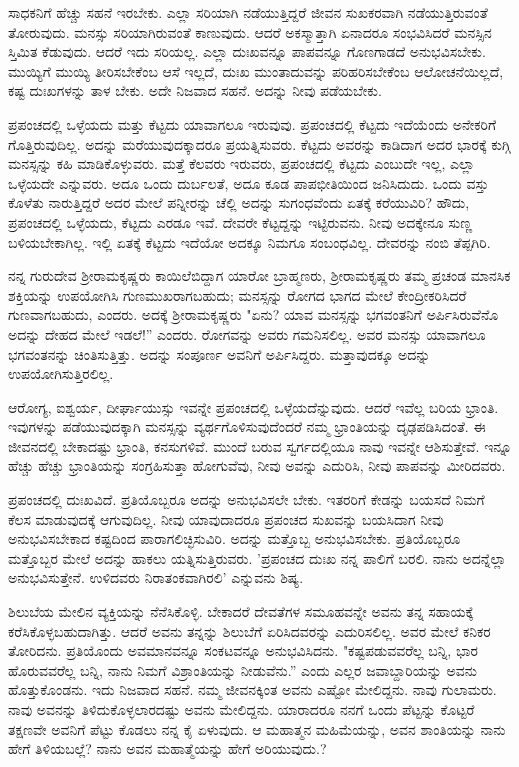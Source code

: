 ಸಾಧಕನಿಗೆ ಹೆಚ್ಚು ಸಹನೆ ಇರಬೇಕು. ಎಲ್ಲಾ ಸರಿಯಾಗಿ ನಡೆಯುತ್ತಿದ್ದರೆ ಜೀವನ ಸುಖಕರವಾಗಿ ನಡೆಯುತ್ತಿರುವಂತೆ ತೋರುವುದು. ಮನಸ್ಸು ಸರಿಯಾಗಿರುವಂತೆ ಕಾಣುವುದು. ಆದರೆ ಅಕಸ್ಮಾತ್ತಾಗಿ ಏನಾದರೂ ಸಂಭವಿಸಿದರೆ ಮನಸ್ಸಿನ ಸ್ತಿಮಿತ ಕೆಡುವುದು. ಆದರೆ ಇದು ಸರಿಯಲ್ಲ. ಎಲ್ಲಾ ದುಃಖವನ್ನೂ ಪಾಪವನ್ನೂ ಗೊಣಗಾಡದೆ ಅನುಭವಿಸಬೇಕು. ಮುಯ್ಯಿಗೆ ಮುಯ್ಯಿ ತೀರಿಸಬೇಕೆಂಬ ಆಸೆ ಇಲ್ಲದೆ, ದುಃಖ ಮುಂತಾದುವನ್ನು ಪರಿಹರಿಸಬೇಕೆಂಬ ಆಲೋಚನೆಯಿಲ್ಲದೆ, ಕಷ್ಟ ದುಃಖಗಳನ್ನು ತಾಳ ಬೇಕು. ಅದೇ ನಿಜವಾದ ಸಹನೆ. ಅದನ್ನು ನೀವು ಪಡೆಯಬೇಕು.

ಪ್ರಪಂಚದಲ್ಲಿ ಒಳ್ಳೆಯದು ಮತ್ತು ಕೆಟ್ಟದು ಯಾವಾಗಲೂ ಇರುವುವು. ಪ್ರಪಂಚದಲ್ಲಿ ಕೆಟ್ಟದು ಇದೆಯೆಂದು ಅನೇಕರಿಗೆ ಗೊತ್ತಿರುವುದಿಲ್ಲ. ಅದನ್ನು ಮರೆಯುವುದಕ್ಕಾದರೂ ಪ್ರಯತ್ನಿಸುವರು. ಕೆಟ್ಟದು ಅವರನ್ನು ಕಾಡಿದಾಗ ಅದರ ಭಾರಕ್ಕೆ ಕುಗ್ಗಿ ಮನಸ್ಸನ್ನು ಕಹಿ ಮಾಡಿಕೊಳ್ಳುವರು. ಮತ್ತೆ ಕೆಲವರು ಇರುವರು, ಪ್ರಪಂಚದಲ್ಲಿ ಕೆಟ್ಟದು ಎಂಬುದೇ ಇಲ್ಲ, ಎಲ್ಲಾ ಒಳ್ಳೆಯದೇ ಎನ್ನುವರು. ಅದೂ ಒಂದು ದುರ್ಬಲತೆ, ಅದೂ ಕೂಡ ಪಾಪಭೀತಿಯಿಂದ ಜನಿಸಿದುದು. ಒಂದು ವಸ್ತು ಕೊಳೆತು ನಾರುತ್ತಿದ್ದರೆ ಅದರ ಮೇಲೆ ಪನ್ನೀರನ್ನು ಚೆಲ್ಲಿ ಅದನ್ನು ಸುಗಂಧವೆಂದು ಏತಕ್ಕೆ ಕರೆಯುವಿರಿ? ಹೌದು, ಪ್ರಪಂಚದಲ್ಲಿ ಒಳ್ಳೆಯದು, ಕೆಟ್ಟದು ಎರಡೂ ಇವೆ. ದೇವರೇ ಕೆಟ್ಟದ್ದನ್ನು ಇಟ್ಟಿರುವನು. ನೀವು ಅದಕ್ಕೇನೂ ಸುಣ್ಣ ಬಳಿಯಬೇಕಾಗಿಲ್ಲ. ಇಲ್ಲಿ ಏತಕ್ಕೆ ಕೆಟ್ಟದು ಇದೆಯೋ ಅದಕ್ಕೂ ನಿಮಗೂ ಸಂಬಂಧವಿಲ್ಲ. ದೇವರನ್ನು ನಂಬಿ ತೆಪ್ಪಗಿರಿ.

ನನ್ನ ಗುರುದೇವ ಶ‍್ರೀರಾಮಕೃಷ್ಣರು ಕಾಯಿಲೆಬಿದ್ದಾಗ ಯಾರೋ ಬ್ರಾಹ್ಮಣರು, ಶ‍್ರೀರಾಮಕೃಷ್ಣರು ತಮ್ಮ ಪ್ರಚಂಡ ಮಾನಸಿಕ ಶಕ್ತಿಯನ್ನು ಉಪಯೋಗಿಸಿ ಗುಣಮುಖರಾಗಬಹುದು; ಮನಸ್ಸನ್ನು ರೋಗದ ಭಾಗದ ಮೇಲೆ ಕೇಂದ್ರೀಕರಿಸಿದರೆ ಗುಣವಾಗಬಹುದು, ಎಂದರು. ಅದಕ್ಕೆ ಶ‍್ರೀರಾಮಕೃಷ್ಣರು "ಏನು? ಯಾವ ಮನಸ್ಸನ್ನು ಭಗವಂತನಿಗೆ ಅರ್ಪಿಸಿರುವೆನೊ ಅದನ್ನು ದೇಹದ ಮೇಲೆ ಇಡಲೆ!'' ಎಂದರು. ರೋಗವನ್ನು ಅವರು ಗಮನಿಸಲಿಲ್ಲ. ಅವರ ಮನಸ್ಸು ಯಾವಾಗಲೂ ಭಗವಂತನನ್ನು ಚಿಂತಿಸುತ್ತಿತ್ತು. ಅದನ್ನು ಸಂಪೂರ್ಣ ಅವನಿಗೆ ಅರ್ಪಿಸಿದ್ದರು. ಮತ್ತಾವುದಕ್ಕೂ ಅದನ್ನು ಉಪಯೋಗಿಸುತ್ತಿರಲಿಲ್ಲ.

ಆರೋಗ್ಯ, ಐಶ್ವರ್ಯ, ದೀರ್ಘಾಯುಸ್ಸು ಇವನ್ನೇ ಪ್ರಪಂಚದಲ್ಲಿ ಒಳ್ಳೆಯದೆನ್ನುವುದು. ಆದರೆ ಇವೆಲ್ಲ ಬರಿಯ ಭ್ರಾಂತಿ. ಇವುಗಳನ್ನು ಪಡೆಯುವುದಕ್ಕಾಗಿ ಮನಸ್ಸನ್ನು ವ್ಯರ್ಥಗೊಳಿಸುವುದೆಂದರೆ ನಮ್ಮ ಭ್ರಾಂತಿಯನ್ನು ದೃಢಪಡಿಸಿದಂತೆ. ಈ ಜೀವನದಲ್ಲಿ ಬೇಕಾದಷ್ಟು ಭ್ರಾಂತಿ, ಕನಸುಗಳಿವೆ. ಮುಂದೆ ಬರುವ ಸ್ವರ್ಗದಲ್ಲಿಯೂ ನಾವು ಇವನ್ನೇ ಆಶಿಸುತ್ತೇವೆ. ಇನ್ನೂ ಹೆಚ್ಚು ಹೆಚ್ಚು ಭ್ರಾಂತಿಯನ್ನು ಸಂಗ್ರಹಿಸುತ್ತಾ ಹೋಗುವೆವು, ನೀವು ಅವನ್ನು ಎದುರಿಸಿ, ನೀವು ಪಾಪವನ್ನು ಮೀರಿದವರು.

ಪ್ರಪಂಚದಲ್ಲಿ ದುಃಖವಿದೆ. ಪ್ರತಿಯೊಬ್ಬರೂ ಅದನ್ನು ಅನುಭವಿಸಲೇ ಬೇಕು. ಇತರರಿಗೆ ಕೇಡನ್ನು ಬಯಸದೆ ನಿಮಗೆ ಕೆಲಸ ಮಾಡುವುದಕ್ಕೆ ಆಗುವುದಿಲ್ಲ. ನೀವು ಯಾವುದಾದರೂ ಪ್ರಪಂಚದ ಸುಖವನ್ನು ಬಯಸಿದಾಗ ನೀವು ಅನುಭವಿಸಬೇಕಾದ ಕಷ್ಟದಿಂದ ಪಾರಾಗಲಿಚ್ಛಿಸುವಿರಿ. ಅದನ್ನು ಮತ್ತೊಬ್ಬ ಅನುಭವಿಸಬೇಕು. ಪ್ರತಿಯೊಬ್ಬರೂ ಮತ್ತೊಬ್ಬರ ಮೇಲೆ ಅದನ್ನು ಹಾಕಲು ಯತ್ನಿಸುತ್ತಿರುವರು. 'ಪ್ರಪಂಚದ ದುಃಖ ನನ್ನ ಪಾಲಿಗೆ ಬರಲಿ. ನಾನು ಅದನ್ನೆಲ್ಲಾ ಅನುಭವಿಸುತ್ತೇನೆ. ಉಳಿದವರು ನಿರಾತಂಕವಾಗಿರಲಿ' ಎನ್ನುವನು ಶಿಷ್ಯ.

ಶಿಲುಬೆಯ ಮೇಲಿನ ವ್ಯಕ್ತಿಯನ್ನು ನೆನೆಸಿಕೊಳ್ಳಿ. ಬೇಕಾದರೆ ದೇವತೆಗಳ ಸಮೂಹವನ್ನೇ ಅವನು ತನ್ನ ಸಹಾಯಕ್ಕೆ ಕರೆಸಿಕೊಳ್ಳಬಹುದಾಗಿತ್ತು. ಆದರೆ ಅವನು ತನ್ನನ್ನು ಶಿಲುಬೆಗೆ ಏರಿಸಿದವರನ್ನು ಎದುರಿಸಲಿಲ್ಲ. ಅವರ ಮೇಲೆ ಕನಿಕರ ತೋರಿದನು. ಪ್ರತಿಯೊಂದು ಅವಮಾನವನ್ನೂ ಸಂಕಟವನ್ನೂ ಅನುಭವಿಸಿದನು. "ಕಷ್ಟಪಡುವವರೆಲ್ಲ ಬನ್ನಿ, ಭಾರ ಹೊರುವವರೆಲ್ಲ ಬನ್ನಿ, ನಾನು ನಿಮಗೆ ವಿಶ್ರಾಂತಿಯನ್ನು ನೀಡುವೆನು.” ಎಂದು ಎಲ್ಲರ ಜವಾಬ್ದಾರಿಯನ್ನು ಅವನು ಹೊತ್ತುಕೊಂಡನು. ಇದು ನಿಜವಾದ ಸಹನೆ. ನಮ್ಮ ಜೀವನಕ್ಕಿಂತ ಅವನು ಎಷ್ಟೋ ಮೇಲಿದ್ದನು. ನಾವು ಗುಲಾಮರು. ನಾವು ಅವನನ್ನು ತಿಳಿದುಕೊಳ್ಳಲಾರದಷ್ಟು ಅವನು ಮೇಲಿದ್ದನು. ಯಾರಾದರೂ ನನಗೆ ಒಂದು ಪೆಟ್ಟನ್ನು ಕೊಟ್ಟರೆ ತಕ್ಷಣವೇ ಅವನಿಗೆ ಪೆಟ್ಟು ಕೊಡಲು ನನ್ನ ಕೈ ಏಳುವುದು. ಆ ಮಹಾತ್ಮನ ಮಹಿಮೆಯನ್ನು, ಅವನ ಶಾಂತಿಯನ್ನು ನಾನು ಹೇಗೆ ತಿಳಿಯಬಲ್ಲೆ? ನಾನು ಅವನ ಮಹಾತ್ಮೆಯನ್ನು ಹೇಗೆ ಅರಿಯುವುದು.?

